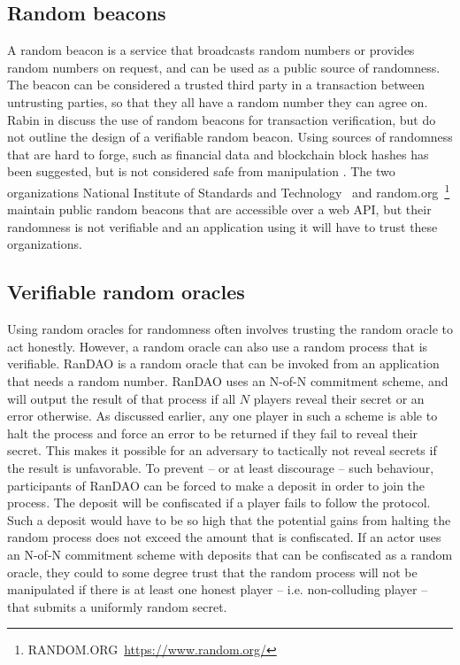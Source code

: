 \subsection{Random beacons}

A random beacon is a service that broadcasts random numbers or provides random numbers on request, and can be used as a public source of randomness. The beacon can be considered a trusted third party in a transaction between untrusting parties, so that they all have a random number they can agree on. Rabin in \cite{rabin_transaction_1983} discuss the use of random beacons for transaction verification, but do not outline the design of a verifiable random beacon. Using sources of randomness that are hard to forge, such as financial data \cite{clark_use_2010} and blockchain block hashes \cite{bentov_bitcoin_2016, yajam_improvement_2019} has been suggested, but is not considered safe from manipulation \cite{bonneau_bitcoin_2015, pierrot_malleability_2018}. The two organizations National Institute of Standards and Technology~\cite{nist_nist_2019} and random.org~\footnote{RANDOM.ORG~\url{https://www.random.org/}} maintain public random beacons that are accessible over a web API, but their randomness is not verifiable and an application using it will have to trust these organizations. 

\subsection{Verifiable random oracles}

Using random oracles for randomness often involves trusting the random oracle to act honestly. However, a random oracle can also use a random process that is verifiable. RanDAO \cite{randao2015randao} is a random oracle that can be invoked from an application that needs a random number. RanDAO uses an N-of-N commitment scheme, and will output the result of that process if all $N$ players reveal their secret or an error otherwise. As discussed earlier, any one player in such a scheme is able to halt the process and force an error to be returned if they fail to reveal their secret. This makes it possible for an adversary to tactically not reveal secrets if the result is unfavorable. To prevent – or at least discourage – such behaviour, participants of RanDAO can be forced to make a deposit in order to join the process. The deposit will be confiscated if a player fails to follow the protocol. Such a deposit would have to be so high that the potential gains from halting the random process does not exceed the amount that is confiscated. If an actor uses an N-of-N commitment scheme with deposits that can be confiscated as a random oracle, they could to some degree trust that the random process will not be manipulated if there is at least one honest player – i.e. non-colluding player – that submits a uniformly random secret.

